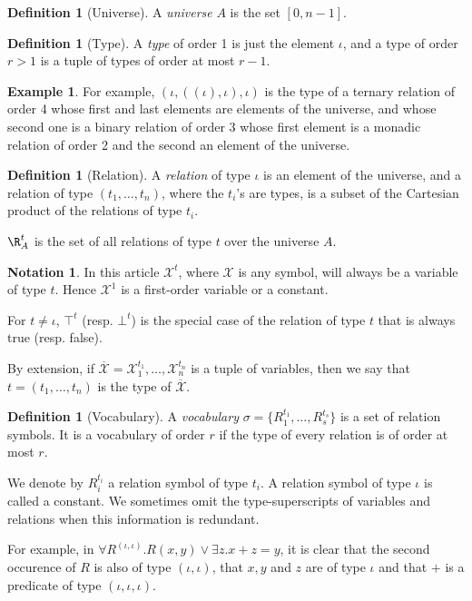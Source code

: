 \documentclass[a4paper,12pt]{article}
\newcommand{\emphdex}[1]{\index{#1}\emph{#1}}
\theoremstyle{definition}
\newtheorem{example}[theorem]{Example}
\newtheorem{definition}[theorem]{Definition}
\newtheorem{notation}[theorem]{Notation}
\newcommand{\mc}{\mathcal}
\newcommand{\olmc}[1]{\overline{\mathcal{#1}}}
\begin{document}
\begin{definition}[Universe]
  A \emphdex{universe} $A$ is the set $[0,n-1]$.
\end{definition}
\begin{definition}[Type]\label{type}
  A \emphdex{type} of order 1 is just the element $\iota$, and a type of
  order $r>1$ is a tuple of types of order at most $r-1$.
\end{definition}
\begin{example}For example, $(\iota,((\iota),\iota),\iota)$ is the
  type of a ternary relation of order 4 whose first and last elements
  are elements of the universe, and whose second one is a binary
  relation of order 3 whose first element is a monadic relation of
  order 2 and the second an element of the universe.
\end{example}
\begin{definition}[Relation]
  A \emphdex{relation} of type $\iota$ is an element of the universe,
  and a relation of type $(t_{1},\dots,t_{n})$, where the $t_{i}$'s
  are types, is a subset of the Cartesian product of the relations of
  type $t_{i}$.

  $\R^{t}_{A}$ is the set of all relations of type $t$ over the
  universe $A$.
\end{definition}
\begin{notation}
  In this article $\mc X^{t}$, where $\mc X$ is any symbol, will
  always be a variable of type $t$. Hence $\mc X^{1}$ is a
  first-order variable or a constant.

  For $t\not= \iota$, $\top^{t}$ (resp.  $\bot^{t}$) is the special case
  of the relation of type $t$ that is always
  true (resp. false). 
\end{notation}

By extension, if $\olmc X=\mc X_{1}^{t_{1}},\dots,\mc X_{n}^{t_{n}}$
is a tuple of variables, then we say that $t=(t_{1},\dots,t_{n})$ is
the type of $\olmc X$. 

\begin{definition}[Vocabulary]
  A \emphdex{vocabulary} $\sigma=\{R_1^{t_1},\dots,R_s^{t_s}\}$ is a set of
  relation symbols.   It is a vocabulary of order
  $r$ if the type of every relation is of order at most $r$.

  We denote by $R_i^{t_i}$ a relation symbol of type $t_i$. A relation
  symbol of type $\iota$ is called a constant. We sometimes omit the
  type-superscripts of variables and relations when this information
  is redundant. 
\end{definition}
For example, in $\forall R^{(\iota,\iota)}. R(x,y)\lor \exists
z. x+z=y$, it is clear that the second occurence of $R$ is also of
type $(\iota,\iota)$, that $x,y$ and $z$ are of type $\iota$ and that
$+$ is a predicate of type $(\iota,\iota,\iota)$.
\end{document}

